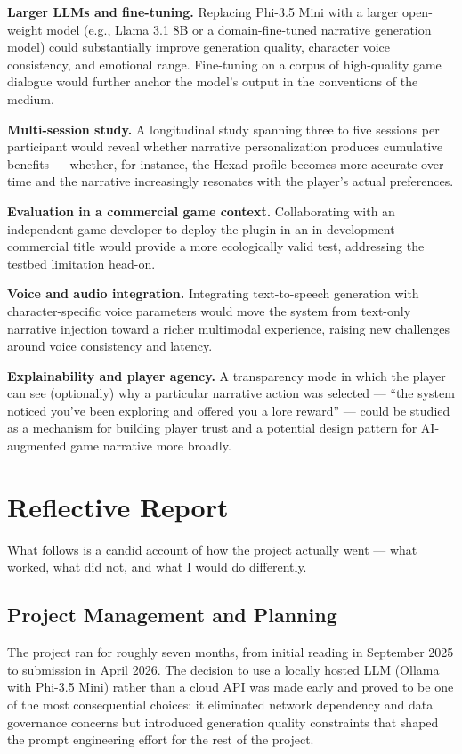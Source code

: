 \textbf{Larger LLMs and fine-tuning.} Replacing Phi-3.5 Mini with a larger open-weight model (e.g., Llama 3.1 8B or a domain-fine-tuned narrative generation model) could substantially improve generation quality, character voice consistency, and emotional range. Fine-tuning on a corpus of high-quality game dialogue would further anchor the model's output in the conventions of the medium.

\textbf{Multi-session study.} A longitudinal study spanning three to five sessions per participant would reveal whether narrative personalization produces cumulative benefits --- whether, for instance, the Hexad profile becomes more accurate over time and the narrative increasingly resonates with the player's actual preferences.

\textbf{Evaluation in a commercial game context.} Collaborating with an independent game developer to deploy the plugin in an in-development commercial title would provide a more ecologically valid test, addressing the testbed limitation head-on.

\textbf{Voice and audio integration.} Integrating text-to-speech generation with character-specific voice parameters would move the system from text-only narrative injection toward a richer multimodal experience, raising new challenges around voice consistency and latency.

\textbf{Explainability and player agency.} A transparency mode in which the player can see (optionally) why a particular narrative action was selected --- ``the system noticed you've been exploring and offered you a lore reward'' --- could be studied as a mechanism for building player trust and a potential design pattern for AI-augmented game narrative more broadly.

\section{Reflective Report}

What follows is a candid account of how the project actually went --- what worked, what did not, and what I would do differently.

\subsection{Project Management and Planning}

The project ran for roughly seven months, from initial reading in September 2025 to submission in April 2026. The decision to use a locally hosted LLM (Ollama with Phi-3.5 Mini) rather than a cloud API was made early and proved to be one of the most consequential choices: it eliminated network dependency and data governance concerns but introduced generation quality constraints that shaped the prompt engineering effort for the rest of the project.

